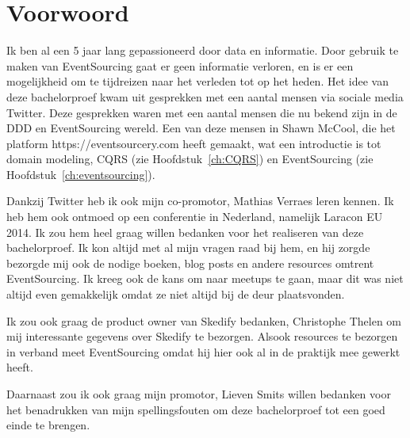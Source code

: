 
\chapter*{Voorwoord}
\label{ch:voorwoord}


Ik ben al een 5 jaar lang gepassioneerd door data en informatie. Door gebruik te maken van EventSourcing gaat er geen informatie verloren, en is er een mogelijkheid om te tijdreizen naar het verleden tot op het heden. Het idee van deze bachelorproef kwam uit gesprekken met een aantal mensen via sociale media Twitter. Deze gesprekken waren met een aantal mensen die nu bekend zijn in de \gls{DDD} en EventSourcing wereld. Een van deze mensen in Shawn McCool, die het platform https://eventsourcery.com heeft gemaakt, wat een introductie is tot domain modeling, \gls{CQRS} (zie Hoofdstuk~\ref{ch:CQRS}) en EventSourcing (zie Hoofdstuk~\ref{ch:eventsourcing}).

Dankzij Twitter heb ik ook mijn co-promotor, Mathias Verraes leren kennen. Ik heb hem ook ontmoed op een conferentie in Nederland, namelijk Laracon EU 2014. Ik zou hem heel graag willen bedanken voor het realiseren van deze bachelorproef. Ik kon altijd met al mijn vragen raad bij hem, en hij zorgde bezorgde mij ook de nodige boeken, blog posts en andere resources omtrent EventSourcing. Ik kreeg ook de kans om naar \gls{meetups} te gaan, maar dit was niet altijd even gemakkelijk omdat ze niet altijd bij de deur plaatsvonden.

Ik zou ook graag de product owner van Skedify bedanken, Christophe Thelen om mij interessante gegevens over Skedify te bezorgen. Alsook resources te bezorgen in verband meet EventSourcing omdat hij hier ook al in de praktijk mee gewerkt heeft.

Daarnaast zou ik ook graag mijn promotor, Lieven Smits willen bedanken voor het benadrukken van mijn spellingsfouten om deze bachelorproef tot een goed einde te brengen.